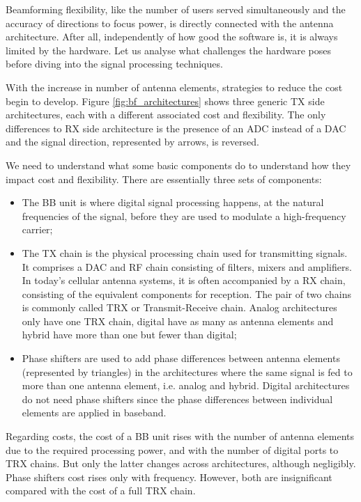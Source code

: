 Beamforming flexibility, like the number of users served simultaneously and the accuracy of directions to focus power, is directly connected with the antenna architecture. After all, independently of how good the software is, it is always limited by the hardware. Let us analyse what challenges the hardware poses before diving into the signal processing techniques.

With the increase in number of antenna elements, strategies to reduce the cost begin to develop. Figure 
\ref{fig:bf_architectures} shows three generic TX side architectures, each with a different associated cost and flexibility. The only differences to \acs{RX} side architecture is the presence of an \ac{ADC} instead of a \ac{DAC} and the signal direction, represented by arrows, is reversed.


We need to understand what some basic components do to understand how they impact cost and flexibility. There are essentially three sets of components:

\begin{itemize}%
    \item The \ac{BB} unit is where digital signal processing happens, at the natural frequencies of the signal, before they are used to modulate a high-frequency carrier;
    \item The \ac{TX} chain is the physical processing chain used for transmitting signals. It comprises a \ac{DAC} and \ac{RF} chain consisting of filters, mixers and amplifiers. In today's cellular antenna systems, it is often accompanied by a \ac{RX} chain, consisting of the equivalent components for reception. The pair of two chains is commonly called \ac{TRX} or Transmit-Receive chain. Analog architectures only have one TRX chain, digital have as many as antenna elements and hybrid have more than one but fewer than digital;
    \item Phase shifters are used to add phase differences between antenna elements (represented by triangles) in the architectures where the same signal is fed to more than one antenna element, i.e. analog and hybrid. Digital architectures do not need phase shifters since the phase differences between individual elements are applied in baseband. 
\end{itemize}

Regarding costs, the cost of a BB unit rises with the number of antenna elements due to the required processing power, and with the number of digital ports to TRX chains. But only the latter changes across architectures, although negligibly. Phase shifters cost rises only with frequency. However, both are insignificant compared with the cost of a full \ac{TRX} chain.

